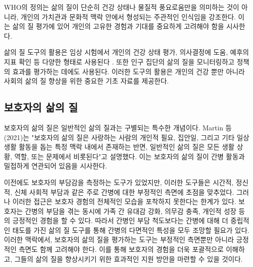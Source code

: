 \documentclass{article}
\begin{document}
WHO의 정의는 삶의 질이 단순히 건강 상태나 물질적 풍요로움만을 의미하는 것이 아니라, 
개인의 가치관과 문화적 맥락 안에서 형성되는 주관적인 인식임을 강조한다. 이는 삶의 질 
평가에 있어 개인의 고유한 경험과 기대를 중요하게 고려해야 함을 시사한다.

삶의 질 도구의 활용은 임상 시험에서 개인의 건강 상태 평가, 의사결정에 도움, 예후의 지표 확인 등 다양한 형태로 사용된다 \cite{fallowfield2009quality}.
또한 인구 집단의 삶의 질을 모니터링하고 정책의 효과를 평가하는 데에도 사용된다\cite{diener1997measuring, hagerty2001quality}.
이러한 도구의 활용은 개인의 건강 뿐만 아니라 사회의 삶의 질 향상을 위한 중요한 기초 자료를 제공한다.


\subsection{보호자의 삶의 질}
보호자의 삶의 질은 일반적인 삶의 질과는 구별되는 특수한 개념이다. Martin 등(2021)는
"보호자의 삶의 질은 사랑하는 사람의 개인적 필요, 집안일, 그리고 기타 일상생활 활동을 돕는 특정 맥락 내에서 존재하는 반면, 일반적인 삶의 질은 모든 생활 상황, 역할, 또는 문제에서 비롯된다"고 설명했다\cite{martin2021caregiver}.
이는 보호자의 삶의 질이 간병 활동과 밀접하게 연관되어 있음을 시사한다.

이전에도 보호자의 부담감을 측정하는 도구가 있었지만, 이러한 도구들은 시간적, 정신적, 신체 사회적 부담과 같은 주로 간병에 대한 부정적인 측면에 초점을 맞추었다\cite{uhm2021reliability,bedard2001zarit}.
그러나 이러한 접근은 보호자 경험의 전체적인 모습을 포착하지 못한다는 한계가 있다. 보호자는 간병의 부담을 겪는 동시에 가족 간 유대감 강화, 의무감 충족, 개인적 성장 등의 긍정적인 경험을 할 수 있다\cite{glozman2004quality}.
따라서 간병인 부담 척도보다는 간병에 대해 더 중립적인 태도를 가진 삶의 질 도구를 통해 간병의 다면적인 특성을 모두 조망할 필요가 있다.
이러한 맥락에서, 보호자의 삶의 질을 평가하는 도구는 부정적인 측면뿐만 아니라 긍정적인 측면도 함께 고려해야 한다.
이를 통해 보호자의 경험을 더욱 포괄적으로 이해하고, 그들의 삶의 질을 향상시키기 위한 효과적인 지원 방안을 마련할 수 있을 것이다.
\end{document}
